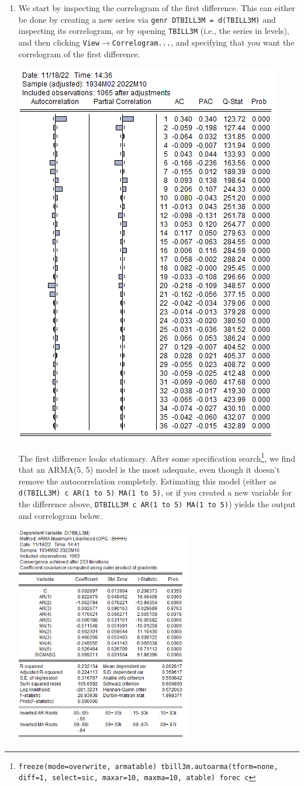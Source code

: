 \documentclass[11pt, a4paper]{article}
\begin{document}
\begin{enumerate}
\begin{enumerate}
\item We start by inspecting the correlogram of the first difference. This can either be done by creating a new series via \texttt{genr DTBILL3M = d(TBILL3M)} and inspecting its correlogram, or by opening \texttt{TBILL3M} (i.e., the series in levels), and then clicking \texttt{View$\rightarrow$\linebreak Correlogram...}, and specifying that you want the correlogram of the first difference.
\begin{center}
\includegraphics[width=.6\textwidth]{dtbillcorr}
\end{center}
The first difference looks stationary. After some specification search\footnote{\texttt{freeze(mode=overwrite, armatable) tbill3m.autoarma(tform=none, diff=1, select=sic, maxar=10, maxma=10, atable) forec c}}, we find that an ARMA(5, 5) model is the most adequate, even though it doesn't remove the autocorrelation completely. Estimating this model (either as \texttt{d(TBILL3M) c AR(1 to 5) MA(1 to 5)}, or if you created a new variable for the difference above, \texttt{DTBILL3M c AR(1 to 5) MA(1 to 5)}) yields the output and correlogram below.
\begin{center}
\includegraphics[width=0.6\textwidth]{arma55}

\end{center}
\end{enumerate}
\end{enumerate}
\end{document}
